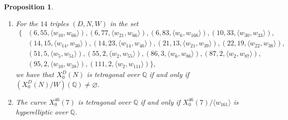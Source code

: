 \documentclass[11pt,reqno]{amsart}
\newcommand{\Q}{\mathbb{Q}}
\newtheorem{proposition}[theorem]{Proposition}
\theoremstyle{definition}
\begin{document}
\begin{proposition}\label{prop: tetragonal_over_Q_iff}
\phantom{a}
\begin{enumerate}
    \item For the $14$ triples $(D,N,W)$ in the set 
\begin{align*}
    \{&(6,55,\langle w_{10}, w_{66} \rangle), (6,77, \langle w_{21},w_{66} \rangle), (6,83,\langle w_{6}, w_{166} \rangle), (10,33,\langle w_{30}, w_{33} \rangle), \\
    &(14,15,\langle w_{14}, w_{30} \rangle), (14, 23,\langle w_{14}, w_{46} \rangle), (21,13,\langle w_{21}, w_{39} \rangle), (22,19,\langle w_{22}, w_{38} \rangle), \\
    &(51,5,\langle w_{5}, w_{51} \rangle), (55,2,\langle w_{2}, w_{55} \rangle), (86,3,\langle w_{6}, w_{86} \rangle), (87,2,\langle w_{2}, w_{87} \rangle), \\
    & (95, 2, \langle w_{10}, w_{38} \rangle), (111,2,\langle w_{2}, w_{111} \rangle)\},
\end{align*}
we have that $X_0^D(N)$ is tetragonal over $\Q$ if and only if $\left(X_0^D(N)/W\right)(\Q) \neq \varnothing$. 

\item The curve $X_0^{46}(7)$ is tetragonal over $\Q$ if and only if $X_0^{46}(7)/\langle w_{161} \rangle$ is hyperelliptic over $\Q$. 
\end{enumerate}
\end{proposition}
\end{document}
